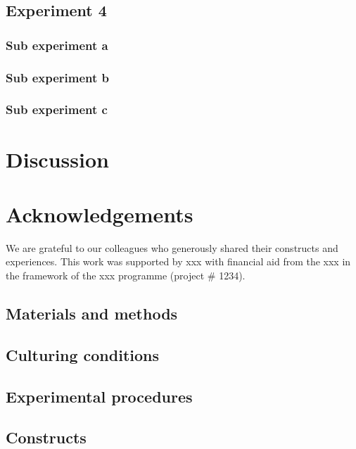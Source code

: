 \documentclass[onecolumn, 11pt,openany]{memoir}
\begin{document}
\begin{multicols}{2}
\subsection{Experiment 4}
\lipsum[1]

\subsubsection{Sub experiment a}
\lipsum[1]

\subsubsection{Sub experiment b}
\lipsum[1]

\subsubsection{Sub experiment c}
\lipsum[1]

\section{Discussion}
\lipsum[1-6]

\section{Acknowledgements}
We are grateful to our colleagues who generously shared their constructs and experiences. This work was supported by xxx with financial aid from the xxx in the framework of the xxx programme (project \# 1234).

\begin{footnotesize}
\section{Materials and methods}

\subsection{Culturing conditions}
\lipsum[1]

\subsection{Experimental procedures}
\lipsum[1]

\subsection{Constructs}
\lipsum[1]


\end{footnotesize}
\end{multicols}
\end{document}
